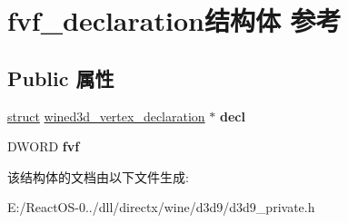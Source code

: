 \hypertarget{structfvf__declaration}{}\section{fvf\+\_\+declaration结构体 参考}
\label{structfvf__declaration}
\subsection*{Public 属性}
\begin{DoxyCompactItemize}
\item 
\mbox{\label{structfvf__declaration_ad13b887b4028a201520d23181a2124ca}} 
\hyperlink{interfacestruct}{struct} \hyperlink{structwined3d__vertex__declaration}{wined3d\+\_\+vertex\+\_\+declaration} $\ast$ {\bfseries decl}
\item 
\mbox{\label{structfvf__declaration_aa8250009eaa4737b162739bd17a5c12c}} 
D\+W\+O\+RD {\bfseries fvf}
\end{DoxyCompactItemize}


该结构体的文档由以下文件生成\+:\begin{DoxyCompactItemize}
\item 
E\+:/\+React\+O\+S-\/0../dll/directx/wine/d3d9/d3d9\+\_\+private.\+h\end{DoxyCompactItemize}
